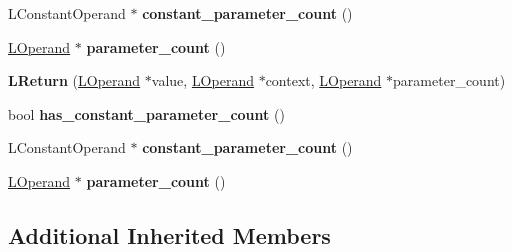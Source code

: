 \begin{DoxyCompactItemize}
\item 
L\+Constant\+Operand $\ast$ {\bfseries constant\+\_\+parameter\+\_\+count} ()\hypertarget{classv8_1_1internal_1_1_l_return_a0453fde1ccafc982160182465d2f2e4a}{}\label{classv8_1_1internal_1_1_l_return_a0453fde1ccafc982160182465d2f2e4a}

\item 
\hyperlink{classv8_1_1internal_1_1_l_operand}{L\+Operand} $\ast$ {\bfseries parameter\+\_\+count} ()\hypertarget{classv8_1_1internal_1_1_l_return_ad644e156a714136b62e763b8239f04fc}{}\label{classv8_1_1internal_1_1_l_return_ad644e156a714136b62e763b8239f04fc}

\item 
{\bfseries L\+Return} (\hyperlink{classv8_1_1internal_1_1_l_operand}{L\+Operand} $\ast$value, \hyperlink{classv8_1_1internal_1_1_l_operand}{L\+Operand} $\ast$context, \hyperlink{classv8_1_1internal_1_1_l_operand}{L\+Operand} $\ast$parameter\+\_\+count)\hypertarget{classv8_1_1internal_1_1_l_return_af69be24dc79385d85a6b221138258d67}{}\label{classv8_1_1internal_1_1_l_return_af69be24dc79385d85a6b221138258d67}

\item 
bool {\bfseries has\+\_\+constant\+\_\+parameter\+\_\+count} ()\hypertarget{classv8_1_1internal_1_1_l_return_a263e1bd29a12702e4c5fc6214fbe4ca5}{}\label{classv8_1_1internal_1_1_l_return_a263e1bd29a12702e4c5fc6214fbe4ca5}

\item 
L\+Constant\+Operand $\ast$ {\bfseries constant\+\_\+parameter\+\_\+count} ()\hypertarget{classv8_1_1internal_1_1_l_return_a0453fde1ccafc982160182465d2f2e4a}{}\label{classv8_1_1internal_1_1_l_return_a0453fde1ccafc982160182465d2f2e4a}

\item 
\hyperlink{classv8_1_1internal_1_1_l_operand}{L\+Operand} $\ast$ {\bfseries parameter\+\_\+count} ()\hypertarget{classv8_1_1internal_1_1_l_return_ad644e156a714136b62e763b8239f04fc}{}\label{classv8_1_1internal_1_1_l_return_ad644e156a714136b62e763b8239f04fc}

\end{DoxyCompactItemize}
\subsection*{Additional Inherited Members}


